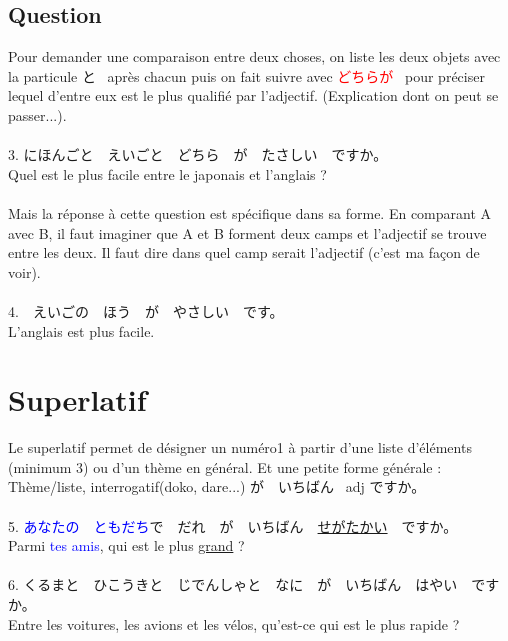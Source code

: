 \documentclass[11pt]{report}
\newenvironment{Japanese}{%
\CJKfamily{min}%
\CJKtilde  
\CJKnospace}{}
\begin{document}
\subsection{Question}

\begin{CJK}{UTF8}{}  
\begin{Japanese}
	Pour demander une comparaison entre deux choses, on liste les deux objets avec la particule と \, après chacun puis on fait suivre avec \textcolor{red}{どちらが} \, pour préciser lequel d'entre eux est le plus qualifi\'e par l'adjectif. (Explication dont on peut se passer...). \\ \\
	3. にほんごと　えいごと　どちら　が　たさしい　ですか。 \\
	Quel est le plus facile entre le japonais et l'anglais ? \\ 
	\\
	Mais la réponse à cette question est spécifique dans sa forme. En comparant A avec B, il faut imaginer que A et B forment deux camps et l'adjectif se trouve entre les deux. Il faut dire dans quel camp serait l'adjectif (c'est ma façon de voir). \\
	\\
	4.　えいごの　ほう　が　やさしい　です。 \\
	L'anglais est plus facile.
\end{Japanese}  
\end{CJK}

\section{Superlatif}

\begin{CJK}{UTF8}{}  
\begin{Japanese}
	Le superlatif permet de désigner un numéro1 \`a partir d'une liste d'éléments (minimum 3) ou d'un thème en général. Et une petite forme générale : \\
	Thème/liste, interrogatif(doko, dare...) が　いちばん \, adj ですか。 \\ \\
	5. \textcolor{blue}{あなたの　ともだち}で　だれ　が　いちばん　\underline{せがたかい}　ですか。 \\
	Parmi \textcolor{blue}{tes amis}, qui est le plus \underline{grand} ? \\ \\
	6. くるまと　ひこうきと　じでんしゃと　なに　が　いちばん　はやい　ですか。 \\
	Entre les voitures, les avions et les vélos, qu'est-ce qui est le plus rapide ?
	
\end{Japanese}  
\end{CJK}
\end{document}
